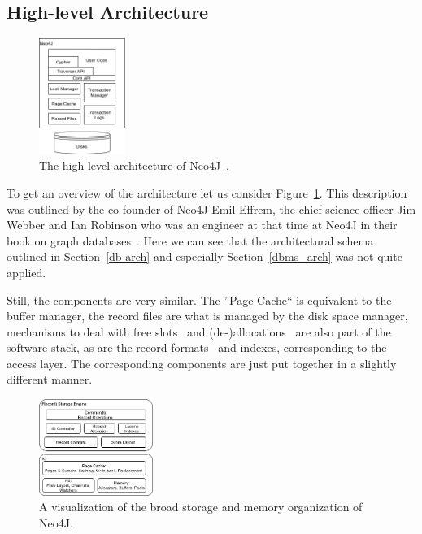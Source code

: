     \subsection{High-level Architecture}
        \begin{figure}[htp]
            \begin{center}
                \includegraphics[keepaspectratio,width=0.25\textwidth]{img/04-databases/N4J_HLA_Emil.png}
            \end{center}
            \caption{The high level architecture of Neo4J~\autocite{robinson2015graph}.} 
            \label{N4J_HLA_Emil}
        \end{figure}
        
        To get an overview of the architecture let us consider Figure~\ref{N4J_HLA_Emil}.
        This description was outlined by the co-founder of Neo4J Emil Effrem, the chief science officer Jim Webber and Ian Robinson who was an engineer at that time at Neo4J in their book on graph databases~\autocite{robinson2015graph}.
        Here we can see that the architectural schema outlined in Section~\ref{db-arch} and especially Section~\ref{dbms_arch} was not quite applied.
        
        Still, the components are very similar.
        The ''Page Cache`` is equivalent to the buffer manager, the record files are what is managed by the disk space manager, mechanisms to deal with free slots~\autocite{neo4jidgenerator} and (de-)allocations~\autocite{neo4jio} are also part of the software stack, as are the record formats~\autocite{neo4jrecordstorage} and indexes, corresponding to the access layer. 
        The corresponding components are just put together in a slightly different manner. 
        
        \begin{figure}[htp]
            \begin{center}
                \includegraphics[keepaspectratio,width=0.33\textwidth,height=0.3\textheight]{img/04-databases/N4J_Storage.png}
            \end{center}
            \caption{A visualization of the broad storage and memory organization of Neo4J.} \label{N4J_Storage}
        \end{figure}
        
